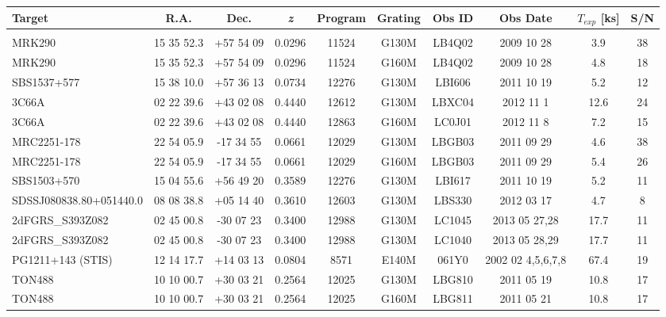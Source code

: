 \documentclass[iop]{emulateapj-rtx4}
\begin{document}
\begin{table}[ht]\footnotesize
\begin{center}
\begin{tabular}{l c c c c c c c c c}
 \hline \hline
  Target & R.A. & Dec. & \textit{z} & Program & Grating & Obs ID & Obs Date & $T_{exp}$ [ks] & S/N  \\ \hline
   
\\
 MRK290					& 15 35 52.3  &  +57 54 09  &  0.0296  & 11524 & G130M     & LB4Q02   & 2009 10 28  &   3.9 &  38  \\
 MRK290					& 15 35 52.3  &  +57 54 09  &  0.0296  & 11524 & G160M     & LB4Q02   & 2009 10 28  &   4.8 &  18  \\
 SBS1537+577 			& 15 38 10.0  &  +57 36 13  &  0.0734  & 12276 & G130M     & LBI606     & 2011 10 19  &   5.2 &  12  \\
 3C66A 					& 02 22 39.6  &  +43 02 08  &  0.4440  & 12612 & G130M     & LBXC04   & 2012 11 1    & 12.6 &  24  \\
 3C66A 					& 02 22 39.6  &  +43 02 08  &  0.4440  & 12863 & G160M     & LC0J01    & 2012 11 8    &  7.2  &  15  \\
 MRC2251-178 			& 22 54 05.9  &  -17 34 55   &  0.0661  & 12029 & G130M     & LBGB03   & 2011 09 29  &  4.6  &  38  \\
 MRC2251-178 			& 22 54 05.9  &  -17 34 55   &  0.0661  & 12029 & G160M     & LBGB03   & 2011 09 29  &  5.4  &  26  \\
 SBS1503+570 			& 15 04 55.6  &  +56 49 20  &  0.3589  & 12276 & G130M     & LBI617     & 2011 10 19  &   5.2 & 11  \\
 SDSSJ080838.80+051440.0 	& 08 08 38.8  &  +05 14 40  &  0.3610  & 12603 & G130M     & LBS330   & 2012 03 17  &    4.7 &  8  \\
 2dFGRS\_S393Z082 		& 02 45 00.8  &  -30 07 23   &  0.3400  & 12988 & G130M     & LC1045   & 2013 05 27,28 & 17.7 & 11  \\
 2dFGRS\_S393Z082 		& 02 45 00.8  &  -30 07 23   &  0.3400  & 12988 & G130M     & LC1040   & 2013 05 28,29 & 17.7 & 11  \\
 PG1211+143 (STIS)			& 12 14 17.7  &  +14 03 13  &  0.0804  &  8571  & E140M     & 061Y0      & 2002 02 4,5,6,7,8  & 67.4 &  19  \\
 TON488 					& 10 10 00.7  &  +30 03 21  &  0.2564  & 12025 & G130M     & LBG810   & 2011 05 19  &  10.8  &  17  \\
 TON488 					& 10 10 00.7  &  +30 03 21  &  0.2564  & 12025 & G160M     & LBG811   & 2011 05  21 &  10.8  &  17  \\

\end{tabular}
\end{center}
\end{table}
\end{document}
